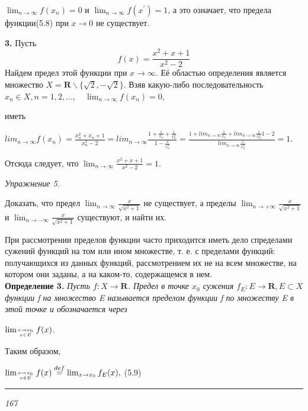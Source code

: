 \documentclass{article}
\begin{document}
\noindent$\lim_{n \to \infty} f(x_{n}) = 0$ и $\lim_{n \to \infty} f(x^{'}) = 1$, а это означает, что предела
функции(5.8) при $x \to 0$ не существует.\par
\quad\textbf{3.} Пусть
\[f(x)=\frac{x^2 + x + 1}{x^2 - 2}\]
Найдем предел этой функции при $x \to \infty$. Её областью определения является множество $X = \textbf{R}\backslash\{\sqrt{2}, - \sqrt{2}\}$. Взяв какую-либо последовательность \(x_{n} \in X, n=1, 2, ... , \quad\lim_{n \to \infty} f(x_{n}) = 0\),\par
{} иметь\par
\begin{center}
    $lim_{n \to \infty} f(x_{n}) = \frac{x_{n}^2 + x_{n} + 1}{x_{n}^2 - 2} = lim_{n \to \infty} \frac{1 + \frac{1}{x_{n}} + \frac{1}{x_{n}^2}
    }{1 - \frac{2}{x_{n}^2}}=\frac{1 + lim_{n \to \infty} \frac{1}{x_{n}} + lim_{n \to \infty} \frac{1}{x_{n}^2}{1 - 2}}{lim_{n \to \infty} \frac{1}{x_{n}^2}}=1$.\par
\end{center}
Отсюда следует, что $\lim_{n \to \infty}{\frac{x^2 + x + 1}{x^2 - 2}}=1.$\par
\begin{large}
    \noindent\textit{Упражнение 5.}
\end{large}
\begin{small}
    Доказать, что предел $\lim_{n \to \infty}{\frac{x}{\sqrt{x^2 + 1}}}$ не существует, а
    пределы $\lim_{n \to +\infty}{\frac{x}{\sqrt{x^2 + 1}}}$ и $\lim_{n \to -\infty}{\frac{x}{\sqrt{x^2 + 1}}}$ существуют, и найти их.\par
\end{small}
При рассмотрении пределов функции часто приходится иметь дело спределами сужений функций на том или ином множестве,
т. е. с пределами функций: получающихся из данных функций, рассмотрением их не на всем множестве, на котором они заданы,
а на каком-то, содержащемся в нем.\\
\textbf{Определение 3.}
\textit{Пусть $f:X \to \textbf{R}$. Предел в точке $x_0$ сужения $f_E:E \to \textbf{R}, E \subset X$ функции f на множество E называется
пределом функции f по множеству E в этой точке и обозначается через}\par
\begin{center}
    $\lim_{x \to x_0 \atop x \in E} f(x)$.
\end{center}
Таким образом,
\begin{flushright}
    $\lim_{x \to x_0 \atop x \in E} f(x)\overset{def}{=}\lim_{x \to x_0} f_E(x),$ \phantom{\hspace{55pt}}(5.9)\par
\end{flushright}
\begin{center}
    \rule{50pt}{0.1pt}\par
    \textit{167}
\end{center}
\end{document}
